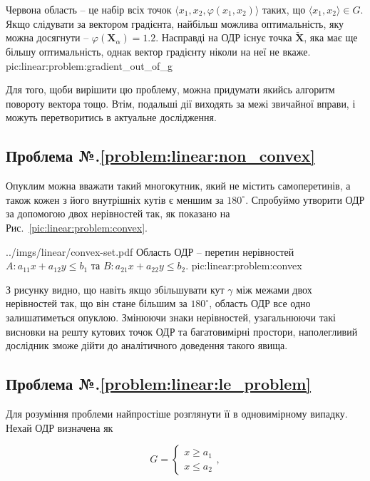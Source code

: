 \documentclass[\main/book.tex]{subfiles}
\begin{document}
 {Червона область -- це набір всіх точок $\langle x_1, x_2, \varphi(x_1, x_2)\rangle$ таких, що $\langle x_1, x_2 \rangle \in G$. Якщо слідувати за вектором градієнта, найбільш можлива оптимальність, яку можна досягнути -- $\varphi(\mathbf{X}_\alpha)=1.2$. Насправді на ОДР існує точка $\widetilde{\mathbf{X}}$, яка має ще більшу оптимальність, однак вектор градієнту ніколи на неї не вкаже.}
 {pic:linear:problem:gradient_out_of_g}

Для того, щоби вирішити цю проблему, можна придумати якийсь алгоритм повороту вектора тощо. Втім, подальші дії виходять за межі звичайної вправи, і можуть перетворитись в актуальне дослідження.

\subsection*{Проблема №.\ref{problem:linear:non_convex}}

Опуклим можна вважати такий многокутник, який не містить самоперетинів, а також кожен з його внутрішніх кутів є меншим за $180^\circ$. Спробуймо утворити ОДР за допомогою двох нерівностей так, як показано на Рис.~\ref{pic:linear:problem:convex}.

\illustration
 {../imgs/linear/convex-set.pdf}
 {Область ОДР -- перетин нерівностей ${A: a_{11} x + a_{12} y \leq b_1}$ та ${B: a_{21} x + a_{22} y \leq b_2}$.}
 {pic:linear:problem:convex}

З рисунку видно, що навіть якщо збільшувати кут $\gamma$ між межами двох нерівностей так, що він стане більшим за $180^\circ$, область ОДР все одно залишатиметься опуклою. Змінюючи знаки нерівностей, узагальнюючи такі висновки на решту кутових точок ОДР та багатовимірні простори, наполегливий дослідник зможе дійти до аналітичного доведення такого явища.

\subsection*{Проблема №.\ref{problem:linear:le_problem}}

Для розуміння проблеми найпростіше розглянути її в одновимірному випадку. Нехай ОДР визначена як

\[
 G = \left\{
  \begin{array}{l}
   x \geq a_1 \\
   x \leq a_2
  \end{array}
 \right.,
\]
\end{document}
